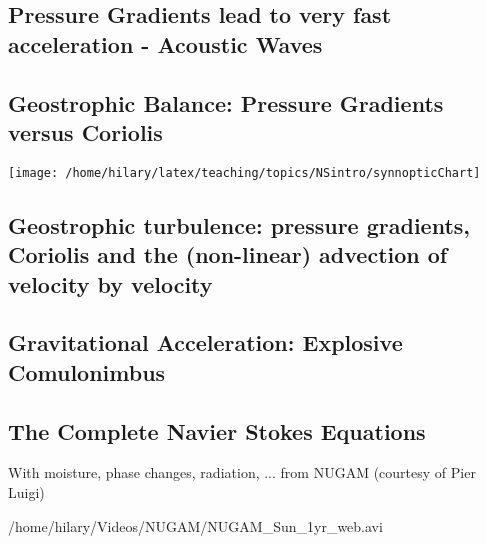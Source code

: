 \clearpage{}

\subsection*{Pressure Gradients lead to very fast acceleration - Acoustic Waves}


\clearpage{}

\subsection*{Geostrophic Balance: Pressure Gradients versus Coriolis}

\texttt{[image: /home/hilary/latex/teaching/topics/NSintro/synnopticChart]}

\clearpage{}

\subsection*{Geostrophic turbulence: pressure gradients, Coriolis and the (non-linear)
advection of velocity by velocity}


\subsection{Gravitational Acceleration: Explosive Comulonimbus}


\clearpage{}

\subsection{The Complete Navier Stokes Equations}

With moisture, phase changes, radiation, ... from NUGAM (courtesy
of Pier Luigi)

{/home/hilary/Videos/NUGAM/NUGAM_Sun_1yr_web.avi}
